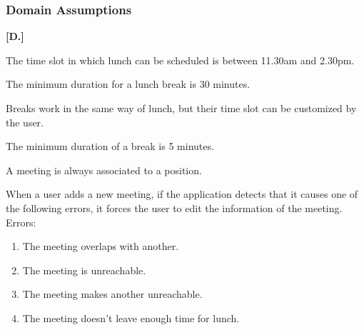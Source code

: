 \subsubsection{Domain Assumptions}
\begin{list}
{\bfseries{}[D.]~}
{
}
\item
The time slot in which lunch can be scheduled is between 11.30am and 2.30pm.
\item
The minimum duration for a lunch break is 30 minutes.
\item
Breaks work in the same way of lunch, but their time slot can be customized by the user.
\item
The minimum duration of a break is 5 minutes.
\item
A meeting is always associated to a position.
\item
When a user adds a new meeting, if the application detects that it causes one of the following errors, it forces the user to edit the information of the meeting. Errors:

\begin{enumerate}
\item
The meeting overlaps with another.
\item
The meeting is unreachable.
\item
The meeting makes another unreachable.
\item
The meeting doesn't leave enough time for lunch.
\end{enumerate}



\end{list}

